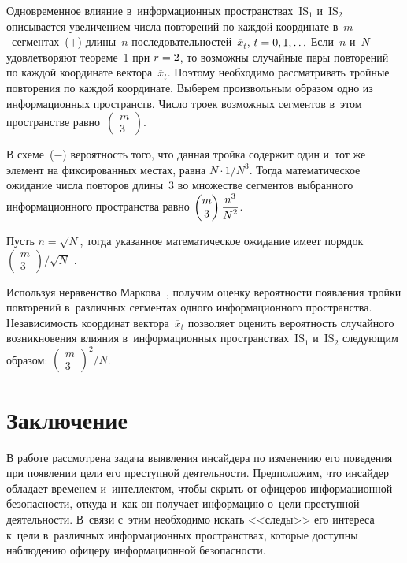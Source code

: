 \begin{multicols}{2}
  Одновременное влияние в~информационных пространствах~$\mathrm{IS}_1$ и~$\mathrm{IS}_2$ 
описывается увеличением числа повторений по каждой координате 
в~$m$~сегментах~($+$) длины~$n$ последовательностей~$\overline{x}_t$, $t\hm = 0, 
1,\ldots$ Если~$n$ и~$N$ удовлетворяют теореме~1 при $r\hm=2$, то возможны 
случайные пары повторений по каждой координате вектора~$\overline{x}_t$. 
Поэтому необходимо рассматривать тройные повторения по каждой координате. 
Выберем произвольным образом одно из информационных пространств. Число 
троек возможных сегментов в~этом пространстве равно~$\begin{pmatrix} 
m\\3\end{pmatrix}$. 
  
  В схеме~($-$) вероятность того, что данная тройка содержит один и~тот же 
элемент на фиксированных местах, равна $N\cdot1/N^3$. Тогда математическое 
ожидание числа повторов длины~3 во множестве сегментов выбранного 
информационного пространства равно $\begin{pmatrix} m\\ 3\end{pmatrix} 
\displaystyle\frac{\displaystyle n^3\mathstrut}{\displaystyle N^2\mathstrut}$. 
  
  Пусть $n=\sqrt{N}$, тогда указанное математическое ожидание имеет порядок 
  $\displaystyle {\begin{pmatrix} m\\ 3\end{pmatrix}}/{\sqrt{N}}$ . 
  
  Используя неравенство Маркова~\cite{14-gr}, получим оценку вероятности 
появления тройки повторений в~различных сегментах одного информационного 
пространства. Независимость координат вектора~$\overline{x}_t$ позволяет 
оценить вероятность случайного возникновения влияния в~информационных 
пространствах~$\mathrm{IS}_1$ и~$\mathrm{IS}_2$ следующим образом: 
  $\displaystyle {\left( \begin{matrix} m\\ 3\end{matrix}\right)^2}/{N}$. 
  
  \section{Заключение }
  
  В работе рассмотрена задача выявления инсайдера по изменению его поведения 
при появлении цели его преступной деятельности. Предположим, что инсайдер 
обладает временем и~интеллектом, чтобы скрыть от офицеров информационной 
без\-опас\-ности, откуда и~как он получает информацию о~цели преступной 
деятельности. В~связи с~этим необходимо искать <<следы>> его интереса к~цели 
в~различных информационных пространствах, которые доступны наблюдению 
офицеру информационной безопасности. 
  

\end{multicols}

